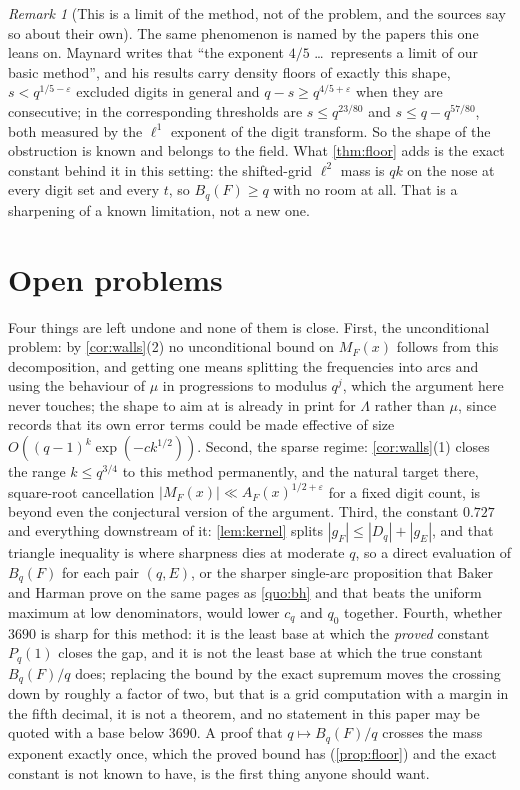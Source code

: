 \documentclass[11pt]{amsart}
\theoremstyle{definition}
\theoremstyle{remark}
\newtheorem{remark}[theorem]{Remark}
\begin{document}
\begin{remark}[This is a limit of the method, not of the problem, and the sources say so about their own]
\label{rem:limit}
The same phenomenon is named by the papers this one leans on. Maynard \cite{maynard22} writes that ``the exponent $4/5$ \ldots\ represents a limit of our basic method'', and his results carry density floors of exactly this shape, $s < q^{1/5-\varepsilon}$ excluded digits in general and $q - s \ge q^{4/5+\varepsilon}$ when they are consecutive; in \cite{maynard19} the corresponding thresholds are $s \le q^{23/80}$ and $s \le q - q^{57/80}$, both measured by the $\ell^1$ exponent of the digit transform. So the shape of the obstruction is known and belongs to the field. What \cref{thm:floor} adds is the exact constant behind it in this setting: the shifted-grid $\ell^2$ mass is $qk$ on the nose at every digit set and every $t$, so $B_q(F) \ge q$ with no room at all. That is a sharpening of a known limitation, not a new one.
\end{remark}

\section{Open problems}
\label{sec:open}

Four things are left undone and none of them is close. First, the unconditional problem: by \cref{cor:walls}(2) no unconditional bound on $M_F(x)$ follows from this decomposition, and getting one means splitting the frequencies into arcs and using the behaviour of $\mu$ in progressions to modulus $q^j$, which the argument here never touches; the shape to aim at is already in print for $\Lambda$ rather than $\mu$, since \cite{maynard22} records that its own error terms could be made effective of size $O((q-1)^k \exp(-c k^{1/2}))$. Second, the sparse regime: \cref{cor:walls}(1) closes the range $k \le q^{3/4}$ to this method permanently, and the natural target there, square-root cancellation $|M_F(x)| \ll A_F(x)^{1/2+\varepsilon}$ for a fixed digit count, is beyond even the conjectural version of the argument. Third, the constant $0.727$ and everything downstream of it: \cref{lem:kernel} splits $|g_F| \le |D_q| + |g_E|$, and that triangle inequality is where sharpness dies at moderate $q$, so a direct evaluation of $B_q(F)$ for each pair $(q, E)$, or the sharper single-arc proposition that Baker and Harman prove on the same pages as \cref{quo:bh} and that beats the uniform maximum at low denominators, would lower $c_q$ and $q_0$ together. Fourth, whether $3690$ is sharp for this method: it is the least base at which the \emph{proved} constant $P_q(1)$ closes the gap, and it is not the least base at which the true constant $B_q(F)/q$ does; replacing the bound by the exact supremum moves the crossing down by roughly a factor of two, but that is a grid computation with a margin in the fifth decimal, it is not a theorem, and no statement in this paper may be quoted with a base below $3690$. A proof that $q \mapsto B_q(F)/q$ crosses the mass exponent exactly once, which the proved bound has (\cref{prop:floor}) and the exact constant is not known to have, is the first thing anyone should want.
\end{document}
